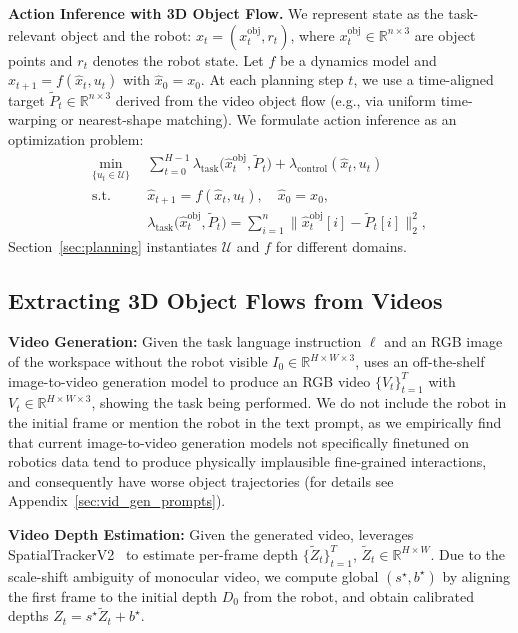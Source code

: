 \textbf{Action Inference with 3D Object Flow.} We represent state as the task-relevant object and the robot: $x_t = (x_t^{\text{obj}}, r_t)$, where $x_t^{\text{obj}} \in \mathbb{R}^{n\times 3}$ are object points and $r_t$ denotes the robot state. Let $f$ be a dynamics model and $\hat{x}_{t+1} = f(\hat{x}_t, u_t)$ with $\hat{x}_0 = x_0$. At each planning step $t$, we use a time-aligned target $\tilde{P}_t \in \mathbb{R}^{n\times 3}$ derived from the video object flow (e.g., via uniform time-warping or nearest-shape matching). We formulate action inference as an optimization problem:
\begin{equation*}
\label{eq:problem}
\begin{aligned}
\min_{\{u_t \in \mathcal{U}\}} \ \ & \sum_{t=0}^{H-1} \lambda_{\text{task}}\big(\hat{x}^{\text{obj}}_t, \tilde{P}_t\big) + \lambda_{\text{control}}(\hat{x}_t, u_t) \\
\text{s.t.}\ \ & \hat{x}_{t+1} = f(\hat{x}_t, u_t), \quad \hat{x}_0 = x_0,\\
                 & \lambda_{\text{task}}\big(\hat{x}^{\text{obj}}_t, \tilde{P}_t\big) = \sum_{i=1}^n \big\|\hat{x}^{\text{obj}}_t[i]-\tilde{P}_t[i]\big\|_2^2,
\end{aligned}
\end{equation*}
Section~\ref{sec:planning} instantiates $\mathcal{U}$ and $f$ for different domains.

\subsection{Extracting 3D Object Flows from Videos}
\label{sec:particle_tracking}

\textbf{Video Generation:} Given the task language instruction $\ell$ and an RGB image of the workspace without the robot visible $I_0\!\in\!\mathbb{R}^{H \times W \times 3}$, \algo uses an off-the-shelf image-to-video generation model
to produce an RGB video $\{V_t\}_{t=1}^T$ with $V_t\!\in\!\mathbb{R}^{H \times W \times 3}$, showing the task being performed. We do not include the robot in the initial frame or mention the robot in the text prompt, as we empirically find that current image-to-video generation models not specifically finetuned on robotics data tend to produce physically implausible fine-grained interactions, and consequently have worse object trajectories (for details see Appendix~\ref{sec:vid_gen_prompts}).

\textbf{Video Depth Estimation:} Given the generated video, \algo leverages SpatialTrackerV2~\cite{xiao2025spatialtracker,yang2024depth} to estimate per-frame depth $\{\tilde{Z}_t\}_{t=1}^T$, $\tilde{Z}_t\!\in\!\mathbb{R}^{H \times W}$. Due to the scale-shift ambiguity of monocular video, we compute global $(s^\star,b^\star)$ by aligning the first frame to the initial depth $D_0$ from the robot, and obtain calibrated depths $Z_t = s^\star\tilde{Z}_t + b^\star$.

